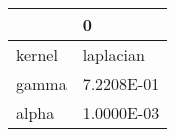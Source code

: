 \begin{tabular}{ll}
\toprule
{} &          0 \\
\midrule
kernel &  laplacian \\
gamma  & 7.2208E-01 \\
alpha  & 1.0000E-03 \\
\bottomrule
\end{tabular}

